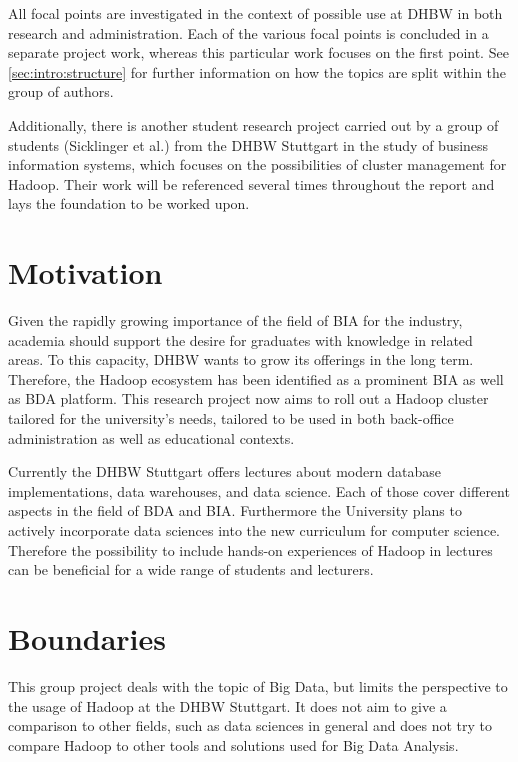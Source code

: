 All focal points are investigated in the context of possible use at \acf{DHBW} in both research and administration. Each of the various focal points is concluded in a separate project work, whereas this particular work focuses on the first point.
See \ref{sec:intro:structure} for further information on how the topics are split within the group of authors.

Additionally, there is another student research project carried out by a group of students (Sicklinger et al.) from the \ac{DHBW} Stuttgart in the study of business information systems, 
which focuses on the possibilities of cluster management for Hadoop.
Their work will be referenced several times throughout the report and lays the foundation to be worked upon.

\section{Motivation}
\label{sec:intro:motivation}

Given the rapidly growing importance of the field of \ac{BIA} for the industry, academia
should support the desire for graduates with knowledge in related areas. To this capacity,
\ac{DHBW} wants to grow its offerings in the long term. Therefore, the Hadoop ecosystem has
been identified as a prominent \ac{BIA} as well as \ac{BDA} platform. This research project now
aims to roll out a Hadoop cluster tailored for the university’s needs, tailored to be used in
both back-office administration as well as educational contexts.

Currently the \ac{DHBW} Stuttgart offers lectures about modern database implementations, 
data warehouses, and data science. Each of those cover different aspects in the field of \ac{BDA} and \ac{BIA}. Furthermore the University plans to actively incorporate data sciences into the new curriculum for computer science.
Therefore the possibility to include hands-on experiences of Hadoop in lectures can be beneficial for a wide range of students and lecturers.

\section{Boundaries}
\label{sec:intro:boundaries}

This group project deals with the topic of Big Data, but limits the perspective to the usage of Hadoop at the \ac{DHBW} Stuttgart.
It does not aim to give a comparison to other fields, such as data sciences in general and does not try to compare Hadoop to other tools and solutions used for Big Data Analysis.


